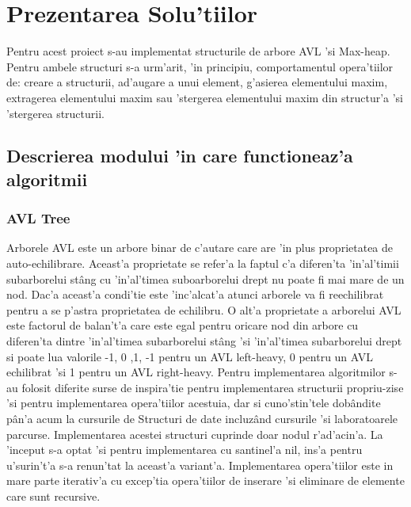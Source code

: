 \chapter{Prezentarea Solu'tiilor}
Pentru acest proiect s-au implementat structurile de arbore AVL 'si Max-heap. Pentru ambele structuri s-a urm'arit, 'in principiu, comportamentul opera'tiilor de: creare a structurii, ad'augare a unui element, g'asierea elementului maxim, extragerea elementului maxim sau 'stergerea elementului maxim din structur'a 'si 'stergerea structurii.
\section{Descrierea modului 'in care functioneaz'a algoritmii}
\subsection{AVL Tree}
Arborele AVL este un arbore binar de c'autare care are 'in plus proprietatea de auto-echilibrare. Aceast'a proprietate se refer'a la faptul c'a diferen'ta 'in'al'timii subarborelui st\^ang cu 'in'al'timea suboarborelui drept nu poate fi mai mare de un nod. Dac'a aceast'a condi'tie este 'inc'alcat'a atunci arborele va fi reechilibrat pentru a se p'astra proprietatea de echilibru\cite{SD}.
\vspace{5 mm}
\newline
\myindent
O alt'a proprietate a arborelui AVL este factorul de balan't'a care este egal pentru oricare nod din arbore cu diferen'ta dintre 'in'al'timea subarborelui st\^ang 'si 'in'al'timea subarborelui drept si poate lua valorile {-1, 0 ,1}, -1 pentru un AVL left-heavy, 0 pentru un AVL echilibrat 'si 1 pentru un AVL right-heavy\cite{SD}.
\vspace{5 mm}
\newline
\myindent
Pentru implementarea algoritmilor s-au folosit diferite surse de inspira'tie pentru implementarea structurii propriu-zise 'si pentru implementarea opera'tiilor acestuia, dar si cuno'stin'tele dob\^andite p\^an'a acum la cursurile de Structuri de date incluz\^and cursurile 'si laboratoarele parcurse\cite{GeeksforGeeks, SD}. Implementarea acestei structuri cuprinde doar nodul r'ad'acin'a. La 'inceput s-a optat 'si pentru implementarea cu santinel'a nil, ins'a pentru u'surin't'a s-a renun'tat la aceast'a variant'a. Implementarea opera'tiilor este in mare parte iterativ'a cu excep'tia opera'tiilor de inserare 'si eliminare de elemente care sunt recursive.
\vspace{5 mm}
